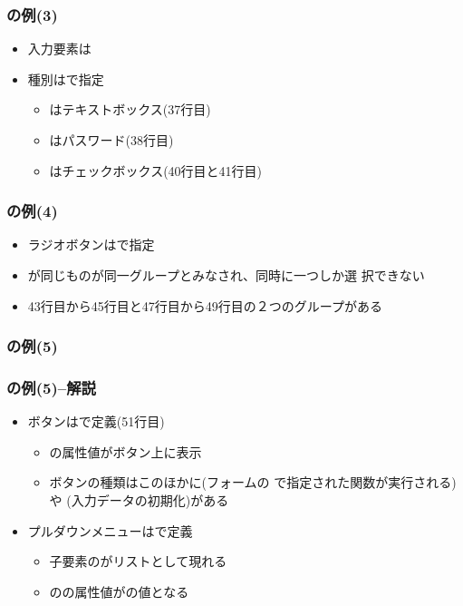 \begin{frame}[containsverbatim]
 \frametitle{の例(3)}\small
 \begin{itemize}
  \item 入力要素は
  \item 種別はで指定
        \begin{itemize}
         \item {}はテキストボックス(37行目)
         \item {}はパスワード(38行目)
         \item {}はチェックボックス(40行目と41行目)
        \end{itemize}
 \end{itemize}
\end{frame}
\begin{frame}[containsverbatim]
 \frametitle{の例(4)}{\footnotesize}
 \begin{itemize}
  \item ラジオボタンはで指定
  \item {}が同じものが同一グループとみなされ、同時に一つしか選
        択できない
  \item 43行目から45行目と47行目から49行目の２つのグループがある
 \end{itemize}
\end{frame}
\begin{frame}[containsverbatim]
 \frametitle{の例(5)}
 \end{frame}
\begin{frame}[containsverbatim]
 \frametitle{の例(5)--解説}
 \begin{itemize}
  \item ボタンはで定義(51行目)
        \begin{itemize}
         \item {}の属性値がボタン上に表示
         \item ボタンの種類はこのほかに(フォームの
               で指定された関数が実行される)や
               (入力データの初期化)がある
        \end{itemize}
  \item プルダウンメニューはで定義
    \begin{itemize}
     \item 子要素のがリストとして現れる
     \item {}のの属性値がの値となる
    \end{itemize}
 \end{itemize}
\end{frame}
